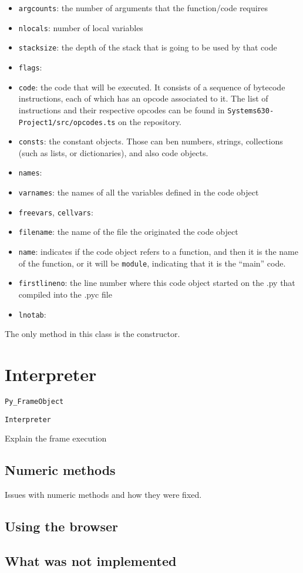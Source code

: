 \documentclass{article}
\begin{document}
\begin{itemize}
	\item \texttt{argcounts}: the number of arguments that the function/code requires
	\item \texttt{nlocals}: number of local variables
	\item \texttt{stacksize}: the depth of the stack that is going to be used by that code
	\item \texttt{flags}: %
	\item \texttt{code}: the code that will be executed. It consists of a sequence of bytecode instructions, each of which has an opcode associated to it. The list of instructions and their respective opcodes can be found in \texttt{Systems630-Project1/src/opcodes.ts} on the repository.
	\item \texttt{consts}: the constant objects. Those can ben numbers, strings, collections (such as lists, or dictionaries), and also code objects.  
	\item \texttt{names}: 
	\item \texttt{varnames}: the names of all the variables defined in the code object
	\item \texttt{freevars}, \texttt{cellvars}: %
	\item \texttt{filename}: the name of the file the originated the code object
	\item \texttt{name}: indicates if the code object refers to a function, and then it is the name of the function, or it will be \texttt{module}, indicating that it is the ``main'' code.
	\item \texttt{firstlineno}: the line number where this code object started on the .py that compiled into the .pyc file
	\item \texttt{lnotab}: %
\end{itemize}

The only method in this class is the constructor.

\section{Interpreter}\label{interpreter}

\texttt{Py\_FrameObject}

\texttt{Interpreter} 

Explain the frame execution

\subsection{Numeric methods}

Issues with numeric methods and how they were fixed.

\subsection{Using the browser}


\subsection{What was not implemented}




%
%

\end{document}
